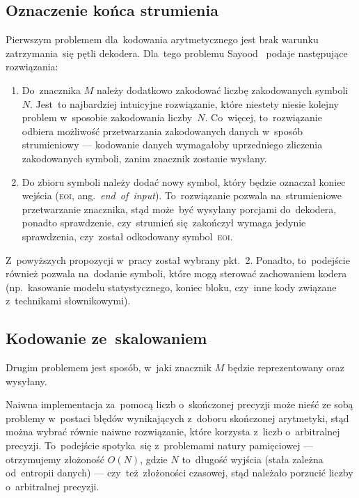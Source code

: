 \documentclass[../../praca.tex]{subfiles}
\begin{document}
\subsection{Oznaczenie końca strumienia}

Pierwszym problemem dla~kodowania arytmetycznego jest brak warunku
zatrzymania~się pętli dekodera. Dla~tego problemu Sayood~\cite{Sayood:IDC}
podaje następujące rozwiązania:

\begin{enumerate}
  \item Do~znacznika \( M \) należy dodatkowo zakodować liczbę zakodowanych
    symboli \( N \). Jest~to najbardziej intuicyjne rozwiązanie, które niestety niesie
    kolejny problem w~sposobie zakodowania liczby~\( N \). Co~więcej, to~rozwiązanie
    odbiera możliwość przetwarzania zakodowanych danych w~sposób strumieniowy ---
    kodowanie danych wymagałoby uprzedniego zliczenia zakodowanych symboli,
    zanim znacznik zostanie wysłany.
  \item Do zbioru symboli należy dodać nowy symbol, który będzie oznaczał koniec 
    wejścia (\textsc{eoi}, ang.~\emph{end~of~input}). To~rozwiązanie pozwala na~strumieniowe
    przetwarzanie znacznika, stąd może~być wysyłany porcjami do~dekodera, ponadto
    sprawdzenie, czy~strumień się~zakończył wymaga jedynie sprawdzenia, czy~został
    odkodowany symbol~\textsc{eoi}.
\end{enumerate}

Z~powyższych propozycji w~pracy został wybrany pkt.~2. Ponadto, to~podejście również
pozwala na~dodanie symboli, które mogą sterować zachowaniem kodera (np.~kasowanie
modelu statystycznego, koniec bloku, czy~inne kody związane z~technikami słownikowymi).

\subsection{Kodowanie ze~skalowaniem}

Drugim problemem jest sposób, w~jaki znacznik \( M \) będzie reprezentowany
oraz wysyłany. 

Naiwna implementacja za~pomocą liczb o~skończonej precyzji może nieść ze sobą
problemy w~postaci błędów wynikających z~doboru skończonej arytmetyki, stąd
można wybrać równie naiwne rozwiązanie, które korzysta z~liczb o~arbitralnej precyzji.
To~podejście spotyka~się z~problemami natury pamięciowej --- otrzymujemy złożoność
\( O (N) \), gdzie \( N \) to~długość wyjścia (stała zależna od~entropii danych) ---
czy~też~złożoności czasowej, stąd należało porzucić liczby o~arbitralnej precyzji.
\end{document}
